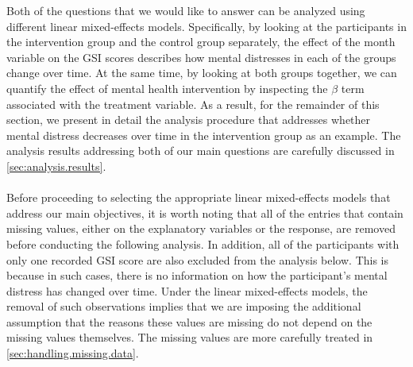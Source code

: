 Both of the questions that we would like to answer can be analyzed using different linear mixed-effects models. Specifically, by looking at the participants in the intervention group and the control group separately, the effect of the month variable on the GSI scores describes how mental distresses in each of the groups change over time. At the same time, by looking at both groups together, we can quantify the effect of mental health intervention by inspecting the $\beta$ term associated with the treatment variable. As a result, for the remainder of this section, we present in detail the analysis procedure that addresses whether mental distress decreases over time in the intervention group as an example. The analysis results addressing both of our main questions are carefully discussed in \cref{sec:analysis.results}.\\\\
Before proceeding to selecting the appropriate linear mixed-effects models that address our main objectives, it is worth noting that all of the entries that contain missing values, either on the explanatory variables or the response, are removed before conducting the following analysis. In addition, all of the participants with only one recorded GSI score are also excluded from the analysis below. This is because in such cases, there is no information on how the participant's mental distress has changed over time. Under the linear mixed-effects models, the removal of such observations implies that we are imposing the additional assumption that the reasons these values are missing do not depend on the missing values themselves. The missing values are more carefully treated in \cref{sec:handling.missing.data}.
